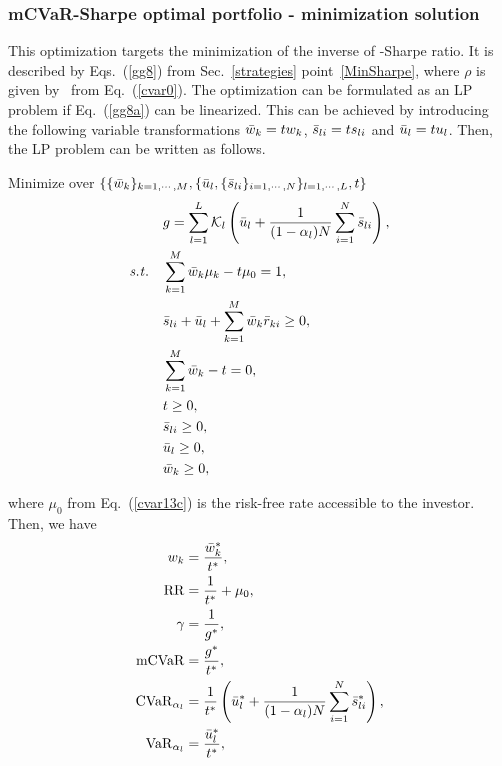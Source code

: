 

\BackToContents

\subsubsection{mCVaR-Sharpe optimal portfolio - minimization solution}
This optimization targets the minimization of the inverse of \mCVaR-Sharpe ratio.
It is  described by Eqs.~(\ref{gg8}) from Sec.~\ref{strategies} point~\ref{MinSharpe}, where
$\rho$ is given by \mCVaR\ from Eq.~(\ref{cvar0}).
The optimization can be formulated as an LP problem if Eq.~(\ref{gg8a}) can be linearized. This can be achieved by
introducing the following variable transformations
${\bar w}_k = t w_k$, ${\bar s}_{li} = t s_{li}$ and ${\bar u}_l = t u_l$.
Then, the LP problem can be written as follows.

\bigskip
\noindent Minimize over $\{\{{\bar w}_k\}_{k=1,\cdots,M}, \{ {\bar u}_l, \{{\bar s}_{li}\}_{i=1,\cdots,N}\}_{l=1,\cdots,L}, t\}$
\begin{subequations}\label{cvar13}
\begin{align}
    &g = \sum_{l=1}^L \cK_l \left( \bu_l + \frac{1}{(1 - \alpha_l) N} \sum_{i=1}^N \bs_{li} \right), \label{cvar13a} \\
    \st &\sum_{k=1}^M \bw_k \mu_k - t\mu_0 = 1, \label{cvar13c} \\
        &\bs_{li} + \bu_l + \sum_{k=1}^M \bw_k \br_{ki} \geq 0, \label{cvar13b} \\
        &\sum_{k=1}^M \bw_k - t = 0, \label{cvar13d} \\
        &t \geq 0, \label{cvar13h} \\
        &\bs_{li} \geq 0, \label{cvar13e} \\
        &\bu_l \geq 0, \label{cvar13f} \\
        &\bw_k \geq 0, \label{cvar13g}
\end{align}
\end{subequations}

\noindent where $\mu_0$ from Eq.~(\ref{cvar13c}) is the risk-free rate accessible to the investor.
Then, we have
\begin{subequations}\label{cvar14}
\begin{align}
    w_k &= \frac{\bw_k^*}{t^*} , \label{cvar14a} \\
    \RR &= \frac{1}{t^*} + \mu_0, \label{cvar14b} \\
    \Sharpe &= \frac{1}{g^*}, \label{cvar14c} \\
    \mCVaR &= \frac{g^*}{t^*} , \label{cvar14d} \\
    \CVaR_{\alpha_l} &= \frac{1}{t^*} \left( \bu_l^* + \frac{1}{(1 - \alpha_l) N} \sum_{i=1}^N \bs_{li}^* \right), \label{cvar14e} \\
    \VaR_{\alpha_l} &= \frac{\bu_l^*}{t^*} , \label{cvar14f}
\end{align}
\end{subequations}

